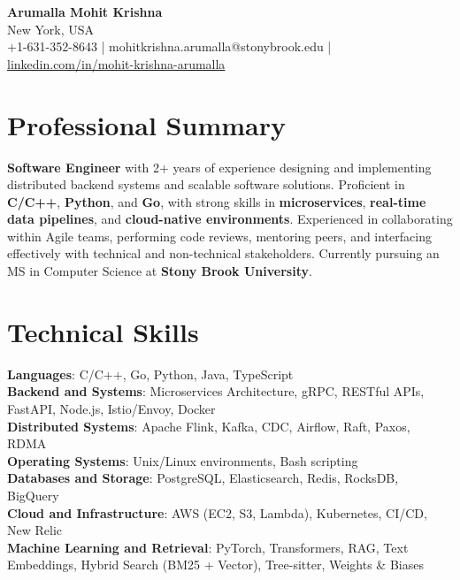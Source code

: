 \documentclass[letterpaper,11pt]{article}
\begin{document}
\begin{center}
  {\Large \textbf{Arumalla Mohit Krishna}} \\
  New York, USA \\
  +1-631-352-8643 \enspace | \enspace mohitkrishna.arumalla@stonybrook.edu \enspace | \enspace \href{https://www.linkedin.com/in/mohit-krishna-arumalla}{linkedin.com/in/mohit-krishna-arumalla}
\end{center}

\section{Professional Summary}
  \begin{itemize}[leftmargin=0.15in, label={}]
    \small{\item{
     \textbf{Software Engineer} with 2+ years of experience designing and implementing distributed backend systems and scalable software solutions. Proficient in \textbf{C/C++}, \textbf{Python}, and \textbf{Go}, with strong skills in \textbf{microservices}, \textbf{real-time data pipelines}, and \textbf{cloud-native environments}. Experienced in collaborating within Agile teams, performing code reviews, mentoring peers, and interfacing effectively with technical and non-technical stakeholders. Currently pursuing an MS in Computer Science at \textbf{Stony Brook University}.
    }}
  \end{itemize}
\vspace{-16pt}

\section{Technical Skills}
 \begin{itemize}[leftmargin=0.15in, label={}]
    \small{\item{
     \textbf{Languages}: C/C++, Go, Python, Java, TypeScript \\
     \textbf{Backend and Systems}: Microservices Architecture, gRPC, RESTful APIs, FastAPI, Node.js, Istio/Envoy, Docker \\
     \textbf{Distributed Systems}: Apache Flink, Kafka, CDC, Airflow, Raft, Paxos, RDMA \\
     \textbf{Operating Systems}: Unix/Linux environments, Bash scripting \\
     \textbf{Databases and Storage}: PostgreSQL, Elasticsearch, Redis, RocksDB, BigQuery \\
     \textbf{Cloud and Infrastructure}: AWS (EC2, S3, Lambda), Kubernetes, CI/CD, New Relic \\
     \textbf{Machine Learning and Retrieval}: PyTorch, Transformers, RAG, Text Embeddings, Hybrid Search (BM25 + Vector), Tree-sitter, Weights \& Biases
    }}
 \end{itemize}
\vspace{-16pt}
\end{document}
